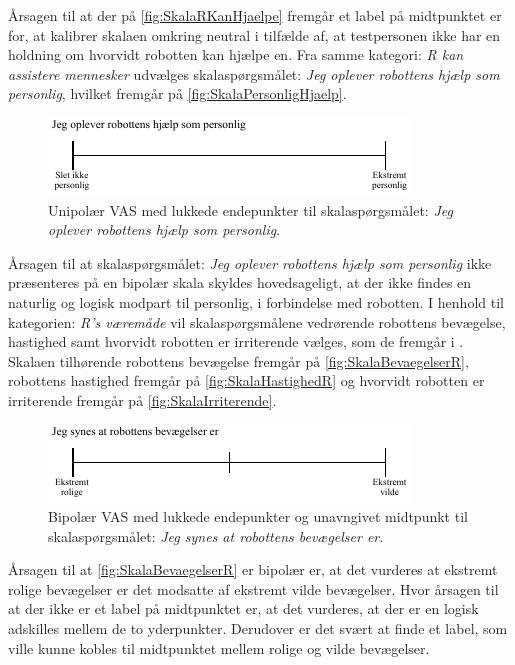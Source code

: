 \noindent
%
Årsagen til at der på \autoref{fig:SkalaRKanHjaelpe} fremgår et label på midtpunktet er for, at kalibrer skalaen omkring neutral i tilfælde af, at testpersonen ikke har en holdning om hvorvidt robotten kan hjælpe en. Fra samme kategori: \textit{R kan assistere mennesker} udvælges skalaspørgsmålet: \textit{Jeg oplever robottens hjælp som personlig}, hvilket fremgår på \autoref{fig:SkalaPersonligHjaelp}.
%
\begin{figure}[H]
\centering
\includegraphics[width =\textwidth]{Figure/UdvalgteSkalaer/PersonligHjaelp} 
\caption{Unipolær VAS med lukkede endepunkter til skalaspørgsmålet: \textit{Jeg oplever robottens hjælp som personlig}.}
\label{fig:SkalaPersonligHjaelp}
\end{figure}
\noindent
%
Årsagen til at skalaspørgsmålet: \textit{Jeg oplever robottens hjælp som personlig} ikke præsenteres på en bipolær skala skyldes hovedsageligt, at der ikke findes en naturlig og logisk modpart til personlig, i forbindelse med robotten.\blankline
%
I henhold til kategorien: \textit{R's væremåde} vil skalaspørgsmålene vedrørende robottens bevægelse, hastighed samt hvorvidt robotten er irriterende vælges, som de fremgår i . Skalaen tilhørende robottens bevægelse fremgår på \autoref{fig:SkalaBevaegelserR}, robottens hastighed fremgår på \autoref{fig:SkalaHastighedR} og hvorvidt robotten er irriterende fremgår på \autoref{fig:SkalaIrriterende}.  
%
\begin{figure}[H]
\centering
\includegraphics[width =\textwidth]{Figure/UdvalgteSkalaer/BevaegelserR} 
\caption{Bipolær VAS med lukkede endepunkter og unavngivet midtpunkt til skalaspørgsmålet: \textit{Jeg synes at robottens bevægelser er}.}
\label{fig:SkalaBevaegelserR}
\end{figure}
\noindent
%
Årsagen til at \autoref{fig:SkalaBevaegelserR} er bipolær er, at det vurderes at ekstremt rolige bevægelser er det modsatte af ekstremt vilde bevægelser. Hvor årsagen til at der ikke er et label på midtpunktet er, at det vurderes, at der er en logisk adskilles mellem de to yderpunkter. Derudover er det svært at finde et label, som ville kunne kobles til midtpunktet mellem rolige og vilde bevægelser.
